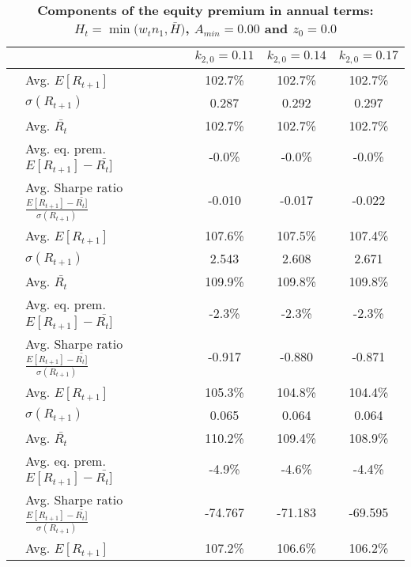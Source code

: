 \documentclass[letterpaper,12pt]{article}
\theoremstyle{definition}
\begin{document}
\begin{spacing}{1.5}
  \begin{table}[htbp]\centering\captionsetup{width=6.0in}
    \caption{\label{TabEqPrem_A0}\textbf{Components of the equity premium in annual terms: $H_t = \min\bigl(w_t n_1, \bar{H}\bigr)$, $A_{min}=0.00$ and $z_0=0.0$}}
    \begin{threeparttable}
    \begin{tabular}{>{\small}l| >{\small}l| >{\small}c| >{\small}c| >{\small}c}
      \hline\hline
      & & $k_{2,0}=0.11$ & $k_{2,0}=0.14$ & $k_{2,0}=0.17$ \\
      \hline
      \multirow{5}{*}{$\bar{H}=0.00$} & \quad Avg. $E[R_{t+1}]$ & 102.7\% & 102.7\% & 102.7\% \\
      & \quad $\sigma(R_{t+1})$ & 0.287 & 0.292 & 0.297 \\
      & \quad Avg. $\bar{R_t}$ & 102.7\% & 102.7\% & 102.7\% \\
      & \quad Avg. eq. prem. $E[R_{t+1}] - \bar{R_t]}$ & -0.0\% & -0.0\% & -0.0\% \\
      & \quad Avg. Sharpe ratio $\frac{E[R_{t+1}] - \bar{R_t]}}{\sigma(R_{t+1})}$ & -0.010 & -0.017 & -0.022 \\
      \hline
      \multirow{5}{*}{$\bar{H}=0.05$} & \quad Avg. $E[R_{t+1}]$ & 107.6\% & 107.5\% & 107.4\% \\
      & \quad $\sigma(R_{t+1})$ & 2.543 & 2.608 & 2.671 \\
      & \quad Avg. $\bar{R_t}$ & 109.9\% & 109.8\% & 109.8\% \\
      & \quad Avg. eq. prem. $E[R_{t+1}] - \bar{R_t]}$ & -2.3\% & -2.3\% & -2.3\% \\
      & \quad Avg. Sharpe ratio $\frac{E[R_{t+1}] - \bar{R_t]}}{\sigma(R_{t+1})}$ & -0.917 & -0.880 & -0.871 \\
      \hline
      \multirow{5}{*}{$\bar{H}=0.11$} & \quad Avg. $E[R_{t+1}]$ & 105.3\% & 104.8\% & 104.4\% \\
      & \quad $\sigma(R_{t+1})$ & 0.065 & 0.064 & 0.064 \\
      & \quad Avg. $\bar{R_t}$ & 110.2\% & 109.4\% & 108.9\% \\
      & \quad Avg. eq. prem. $E[R_{t+1}] - \bar{R_t]}$ & -4.9\% & -4.6\% & -4.4\% \\
      & \quad Avg. Sharpe ratio $\frac{E[R_{t+1}] - \bar{R_t]}}{\sigma(R_{t+1})}$ & -74.767 & -71.183 & -69.595 \\
      \hline
      \multirow{5}{*}{$\bar{H}=0.17$} & \quad Avg. $E[R_{t+1}]$ & 107.2\% & 106.6\% & 106.2\% \\

\end{tabular}
\end{threeparttable}
\end{table}
\end{spacing}
\end{document}
